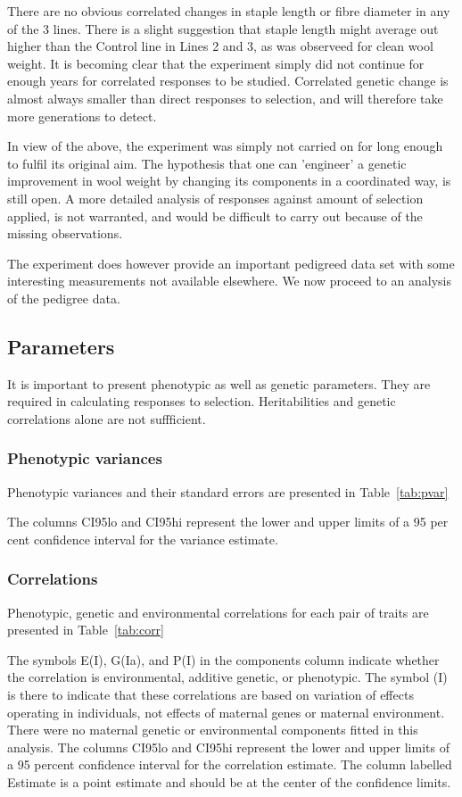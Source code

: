 \documentclass[titlepage]{article}  %
\begin{document}


There are no obvious correlated changes in staple length or fibre diameter in any of the 3 lines. There is a slight suggestion that staple length might average out higher than the Control line in Lines 2 and 3, as was observeed for clean wool weight. It is becoming clear that the experiment simply did not continue for enough years for correlated responses to be studied. Correlated genetic change is almost always smaller than direct responses to selection, and will therefore take more generations to detect. 

In view of the above, the experiment was simply not carried on for long enough to fulfil its original aim. The hypothesis that one can 'engineer' a genetic improvement in wool weight by changing its components in a coordinated way, is still open. A more detailed analysis of responses against amount of selection applied, is not warranted, and would be difficult to carry out because of the missing observations.

The experiment does however provide an important pedigreed data set with some interesting measurements not available elsewhere. We now proceed to an analysis of the pedigree data.

\clearpage
\subsection{Parameters}
It is important to present phenotypic as well as genetic parameters. They are required in calculating responses to selection. Heritabilities and genetic correlations alone are not suffficient.

\subsubsection{Phenotypic variances}
Phenotypic variances and their standard errors are presented in Table~\ref{tab:pvar}

The columns CI95lo and CI95hi represent the lower and upper limits of a 95 per
cent confidence interval for the variance estimate.

\subsubsection{Correlations}
Phenotypic, genetic and environmental correlations for each pair of traits are presented in Table~\ref{tab:corr}

The symbols E(I), G(Ia), and P(I) in the components column indicate whether the correlation is environmental, additive genetic, or phenotypic. The symbol (I) is there to indicate that these correlations are based on variation of effects operating in individuals, not effects of maternal genes or maternal environment. There were no maternal genetic or environmental components fitted in this analysis. The columns CI95lo and CI95hi represent the lower and upper limits of a 95 percent confidence interval for the correlation estimate. The column labelled Estimate is a point estimate and should be at the center of the confidence limits.
\end{document}
